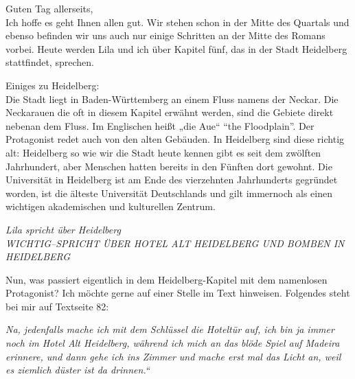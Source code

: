 \documentclass[12pt,a4paper]{article}
\begin{document}
Guten Tag allerseits,\\%
Ich hoffe es geht Ihnen allen gut. Wir stehen schon in der Mitte des Quartals und ebenso befinden wir uns auch nur einige Schritten an der Mitte des Romans vorbei. Heute werden Lila und ich über Kapitel fünf, das in der Stadt Heidelberg stattfindet, sprechen.\par
%
Einiges zu Heidelberg:\\%
Die Stadt liegt in Baden-Württemberg an einem Fluss namens der Neckar. Die Neckarauen die oft in diesem Kapitel erwähnt werden, sind die Gebiete direkt nebenan dem Fluss. Im Englischen heißt „die Aue“ “the Floodplain”. Der Protagonist redet auch von den alten Gebäuden. In Heidelberg sind diese richtig alt: Heidelberg so wie wir die Stadt heute kennen gibt es seit dem zwölften Jahrhundert, aber Menschen hatten bereits in den Fünften dort gewohnt. Die Universität in Heidelberg ist am Ende des vierzehnten Jahrhunderts gegründet worden, ist die älteste Universität Deutschlands und gilt immernoch als einen wichtigen akademischen und kulturellen Zentrum.\par
%
\begin{center}
    \textit{Lila spricht über Heidelberg\\ WICHTIG–SPRICHT ÜBER HOTEL ALT HEIDELBERG UND BOMBEN IN HEIDELBERG}%
\end{center}
\par
Nun, was passiert eigentlich in dem Heidelberg-Kapitel mit dem namenlosen Protagonist? Ich möchte gerne auf einer Stelle im Text hinweisen. Folgendes steht bei mir auf Textseite 82:\\%
\vspace{-2.5em}
\begin{center}
\textit{Na, jedenfalls mache ich mit dem Schlüssel die Hoteltür auf, ich bin ja immer noch im Hotel Alt Heidelberg, während ich mich an das blöde Spiel auf Madeira erinnere, und dann gehe ich ins Zimmer und mache erst mal das Licht an, weil es ziemlich düster ist da drinnen.“}\\%
\end{center}%
\vspace{-.5em}
\end{document}
